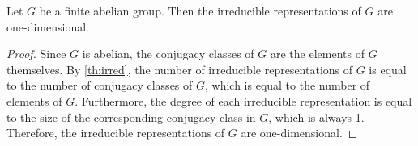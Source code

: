 \begin{corollary}\label{cor:abelian_irred}
    Let $G$ be a finite abelian group. Then the irreducible representations of $G$ are one-dimensional.
\end{corollary}
\begin{proof}
    Since $G$ is abelian, the conjugacy classes of $G$ are the elements of $G$ themselves. By \cref{th:irred}, the number of irreducible representations of $G$ is equal to the number of conjugacy classes of $G$, which is equal to the number of elements of $G$. Furthermore, the degree of each irreducible representation is equal to the size of the corresponding conjugacy class in $G$, which is always 1. Therefore, the irreducible representations of $G$ are one-dimensional.
\end{proof}